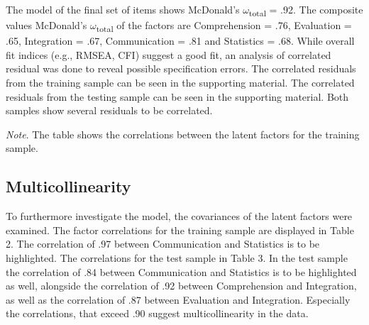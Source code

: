 \documentclass[
  12pt,
  a4paper,
  twoside]{article}
\begin{document}
The model of the final set of items shows McDonald's \(\omega\)\textsubscript{total} = .92. The composite values McDonald's \(\omega\)\textsubscript{total} of the factors are Comprehension = .76, Evaluation = .65, Integration = .67, Communication = .81 and Statistics = .68.
While overall fit indices (e.g., RMSEA, CFI) suggest a good fit, an analysis of correlated residual was done to reveal possible specification errors.
The correlated residuals from the training sample can be seen in the supporting material. The correlated residuals from the testing sample can be seen in the supporting material. Both samples show several residuals to be correlated.

\begin{table}[htpb]
\caption{Latent Factor correlations training sample}


\vspace{10pt}  %
\small\textit{Note}. The table shows the correlations between the latent factors for the training sample.
\end{table}

\subsection{Multicollinearity}\label{multicollinearity}

To furthermore investigate the model, the covariances of the latent factors were examined. The factor correlations for the training sample are displayed in Table 2. The correlation of .97 between Communication and Statistics is to be highlighted. The correlations for the test sample in Table 3. In the test sample the correlation of .84 between Communication and Statistics is to be highlighted as well, alongside the correlation of .92 between Comprehension and Integration, as well as the correlation of .87 between Evaluation and Integration. Especially the correlations, that exceed .90 suggest multicollinearity in the data.
\end{document}
